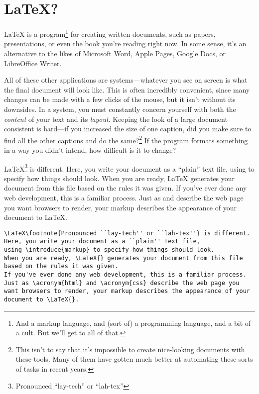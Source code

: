 \chapter{\texorpdfstring{\LaTeX}{LaTeX}?}

\LaTeX{} is a program\footnote{And a markup language,
and (sort of) a programming language, and a bit of a cult.
But we'll get to all of that.}
for creating written documents, such as papers, presentations,
or even the book you're reading right now.
In some sense, it's an alternative to the likes of Microsoft Word,
Apple Pages, Google Docs, or LibreOffice Writer.

All of these other applications are
  systems---whatever
you see on screen is what the final document will look like.
This is often incredibly convenient, since many changes can be made
with a few clicks of the mouse,
but it isn't without its downsides.
In a  system,
you must constantly concern yourself with both
the \emph{content} of your text and its \emph{layout}.
Keeping the look of a large document consistent is hard---if you increased
the size of one caption, did you make sure to find all the other
captions and do the same?\footnote{This isn't to say that it's impossible
to create nice-looking documents with these tools.
Many of them have gotten much better at automating these sorts of
tasks in recent years.}
If the program formats something in a way you didn't intend,
how difficult is it to change?%

\LaTeX\footnote{Pronounced ``lay-tech'' or ``lah-tex''} is different.
Here, you write your document as a ``plain'' text file,
using  to specify how things should look.
When you are ready, \LaTeX{} generates your document from this file
based on the rules it was given.
If you've ever done any web development, this is a familiar process.
Just as  and  describe the web page you
want browsers to render, your markup describes the appearance of your
document to \LaTeX{}.

\begin{leftfigure}
\begin{lstlisting}
\LaTeX\footnote{Pronounced ``lay-tech'' or ``lah-tex''} is different.
Here, you write your document as a ``plain'' text file,
using \introduce{markup} to specify how things should look.
When you are ready, \LaTeX{} generates your document from this file
based on the rules it was given.
If you've ever done any web development, this is a familiar process.
Just as \acronym{html} and \acronym{css} describe the web page you
want browsers to render, your markup describes the appearance of your
document to \LaTeX{}.
\end{lstlisting}
\end{leftfigure}

